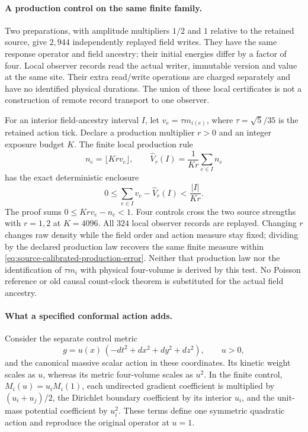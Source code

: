 \paragraph{A production control on the same finite family.}
Two preparations, with amplitude multipliers $1/2$ and $1$ relative to
the retained source, give $2{,}944$ independently replayed field writes.
They have the same response operator and field ancestry; their initial
energies differ by a factor of four. Local observer records read the
actual writer, immutable version and value at the same site. Their extra
read/write operations are charged separately and have no identified
physical durations. The union of these local certificates is not a
construction of remote record transport to one observer.

For an interior field-ancestry interval $I$, let
$v_e=\tau m_{i(e)}$, where $\tau=\sqrt5/35$ is the retained action tick.
Declare a production multiplier $r>0$ and an integer exposure budget
$K$. The finite local production rule
\[
 n_e=\lfloor Krv_e\rfloor,\qquad
 \widehat V_r(I)=\frac{1}{Kr}\sum_{e\in I}n_e
\]
has the exact deterministic enclosure
\begin{equation}
 0\le \sum_{e\in I}v_e-\widehat V_r(I)
 <\frac{|I|}{Kr}.
 \label{eq:source-calibrated-production-error}
\end{equation}
The proof sums $0\le Krv_e-n_e<1$. Four controls cross the two source
strengths with $r=1,2$ at $K=4096$. All $324$ local observer records are
replayed. Changing $r$ changes raw density while the field order and
action measure stay fixed; dividing by the declared production law
recovers the same finite measure within
\eqref{eq:source-calibrated-production-error}. Neither that production
law nor the identification of $\tau m_i$ with physical four-volume is
derived by this test. No Poisson reference or old causal count-clock
theorem is substituted for the actual field ancestry.

\paragraph{What a specified conformal action adds.}
Consider the separate control metric
\[
 g=u(x)\,(-dt^2+dx^2+dy^2+dz^2),\qquad u>0,
\]
and the canonical massive scalar action in these coordinates. Its kinetic weight scales as $u$,
whereas its metric four-volume scales as $u^2$. In the finite control,
$M_i(u)=u_iM_i(1)$, each undirected gradient coefficient is multiplied
by $(u_i+u_j)/2$, the Dirichlet boundary coefficient by its interior
$u_i$, and the unit-mass potential coefficient by $u_i^2$.
These terms define one symmetric quadratic action and reproduce the
original operator at $u=1$.

